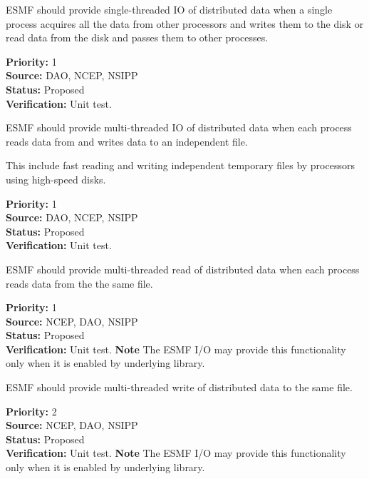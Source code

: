 
ESMF should provide single-threaded IO of distributed data when a
single process acquires all the data from other processors and writes
them to the disk or read data from the disk and passes them to other 
processes. 


\begin{reqlist}
{\bf Priority:} 1 \\
{\bf Source:} DAO, NCEP, NSIPP \\
{\bf Status:} Proposed \\
{\bf Verification:} Unit test.
\end{reqlist}




ESMF should provide multi-threaded IO of distributed data when each
process reads data from and writes data to an independent file. 

This include fast reading and writing independent temporary files by 
processors using high-speed disks.

\begin{reqlist}
{\bf Priority:} 1 \\
{\bf Source:} DAO, NCEP, NSIPP \\
{\bf Status:} Proposed \\
{\bf Verification:} Unit test.
\end{reqlist}




ESMF should provide multi-threaded read of distributed data when each
process reads data from the the same file.  

\begin{reqlist}
{\bf Priority:} 1 \\
{\bf Source:} NCEP, DAO, NSIPP \\
{\bf Status:} Proposed \\
{\bf Verification:} Unit test.
{\bf Note} The ESMF I/O may provide this functionality only when it is 
enabled by underlying library. 
\end{reqlist}





ESMF should provide multi-threaded write of distributed data to the same 
file.  

\begin{reqlist}
{\bf Priority:} 2 \\
{\bf Source:} NCEP, DAO, NSIPP \\
{\bf Status:} Proposed \\
{\bf Verification:} Unit test.
{\bf Note} The ESMF I/O may provide this functionality only when it is 
enabled by underlying library. 
\end{reqlist}